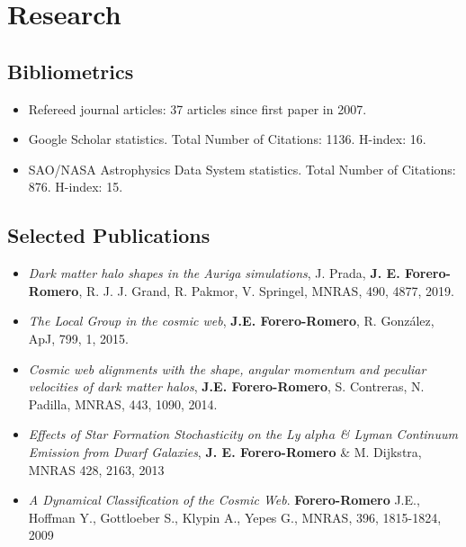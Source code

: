 \documentclass[a4paper,10pt]{article} %
\begin{document}
\color{red}
\section{Research}
\color{black}

\subsection{Bibliometrics}
\begin{itemize}
\item Refereed journal articles:  37 articles since first paper in 2007.
\item Google Scholar statistics. Total Number of Citations: 1136. H-index: 16.
\item SAO/NASA Astrophysics Data System statistics. Total Number of
  Citations: 876. H-index: 15. 
\end{itemize}


\subsection{Selected Publications}
\begin{itemize}

\item {\it Dark matter halo shapes in the Auriga simulations}, 
  J. Prada, {\bf J. E. Forero-Romero}, R. J. J. Grand, R. Pakmor, 
  V. Springel,  MNRAS, 490, 4877, 2019.

\item{\it The Local Group in the cosmic web}, {\bf
  J.E. Forero-Romero}, R. Gonz\'alez, ApJ, 799, 1, 2015.

\item{\it Cosmic web alignments with the shape, angular momentum
  and peculiar velocities of dark matter halos}, 
  {\bf J.E. Forero-Romero}, S. Contreras, N. Padilla, MNRAS, 443,
  1090, 2014. 

\item {\it Effects of Star Formation Stochasticity on the Ly
  $alpha$ \& Lyman Continuum Emission from Dwarf Galaxies}, {\bf
  J. E. Forero-Romero} \& M. Dijkstra, MNRAS 428, 2163, 2013 

\item  {\it A Dynamical Classification of the  Cosmic Web}.  {\bf
  Forero-Romero} J.E., Hoffman Y.,  Gottloeber S., Klypin A., Yepes
  G., MNRAS, 396, 1815-1824, 2009   

\end{itemize}
\end{document}
